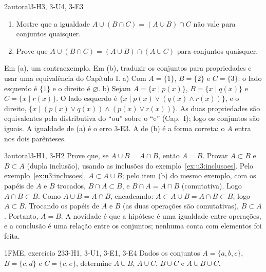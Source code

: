\begin{exemplo}{}{2}{autoral}{3-H3, 3-U4, 3-E3}
\label{ex:u3:distributiva}
\begin{enumerate}[label=\alph*)]
  \item Mostre que a igualdade $A\cup(B\cap C)=(A\cup B)\cap C$ não vale para conjuntos quaisquer.
  \item Prove que $A\cup(B\cap C)=(A\cup B)\cap(A\cup C)$ para conjuntos quaisquer.
\end{enumerate}
\plano Em (a), um contraexemplo. Em (b), traduzir os conjuntos para propriedades e usar uma equivalência do Capítulo I.
\resolucao a) Com $A=\{1\}$, $B=\{2\}$ e $C=\{3\}$: o lado esquerdo é $\{1\}$ e o direito é $\varnothing$. b) Sejam $A=\{x\mid p(x)\}$, $B=\{x\mid q(x)\}$ e $C=\{x\mid r(x)\}$. O lado esquerdo é $\{x\mid p(x)\vee(q(x)\wedge r(x))\}$, e o direito, $\{x\mid (p(x)\vee q(x))\wedge(p(x)\vee r(x))\}$. As duas propriedades são equivalentes pela distributiva do \enquote{ou} sobre o \enquote{e} (Cap.~I); logo os conjuntos são iguais.
\comentario A igualdade de (a) é o erro 3-E3. A de (b) é a forma correta: o $A$ entra nos dois parênteses.
\end{exemplo}

\begin{exemplo}{}{3}{autoral}{3-H1, 3-H2}
\label{ex:u3:iguais}
Prove que, se $A\cup B=A\cap B$, então $A=B$.
\plano Provar $A\subset B$ e $B\subset A$ (dupla inclusão), usando as inclusões do exemplo~\ref{ex:u3:inclusoes}.
\resolucao Pelo exemplo~\ref{ex:u3:inclusoes}, $A\subset A\cup B$; pelo item (b) do mesmo exemplo, com os papéis de $A$ e $B$ trocados, $B\cap A\subset B$, e $B\cap A=A\cap B$ (comutativa). Logo $A\cap B\subset B$. Como $A\cup B=A\cap B$, encadeando: $A\subset A\cup B=A\cap B\subset B$, logo $A\subset B$. Trocando os papéis de $A$ e $B$ (as duas operações são comutativas), $B\subset A$. Portanto, $A=B$.
\comentario A novidade é que a hipótese é uma igualdade entre operações, e a conclusão é uma relação entre os conjuntos; nenhuma conta com elementos foi feita.
\end{exemplo}

\Questoes

\begin{questao}{1}{FME, exercício 23}{3-H1, 3-U1, 3-E1, 3-E4}\label{u3:fme23}
Dados os conjuntos $A=\{a,b,c\}$, $B=\{c,d\}$ e $C=\{c,e\}$, determine $A\cup B$, $A\cup C$, $B\cup C$ e $A\cup B\cup C$.
\end{questao}

